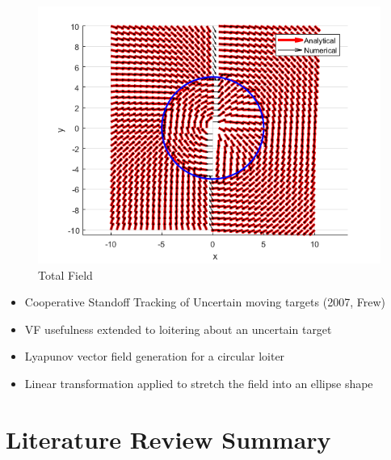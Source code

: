 \documentclass[numbered,pdftex]{ohio-etd}
\begin{document}
\begin{figure}[h]
	\centering
	\includegraphics[width=0.7\linewidth]{PaperFigures/total}
	\caption{Total Field}
	\label{fig:total}
\end{figure}

\begin{itemize}
	\item Cooperative Standoff Tracking of Uncertain moving targets (2007, Frew)
	\item VF usefulness extended to loitering about an uncertain target
	\item Lyapunov vector field generation for a circular loiter
	\item Linear transformation applied to stretch the field into an ellipse shape
\end{itemize}



\section{Literature Review Summary}

   

\end{document}
